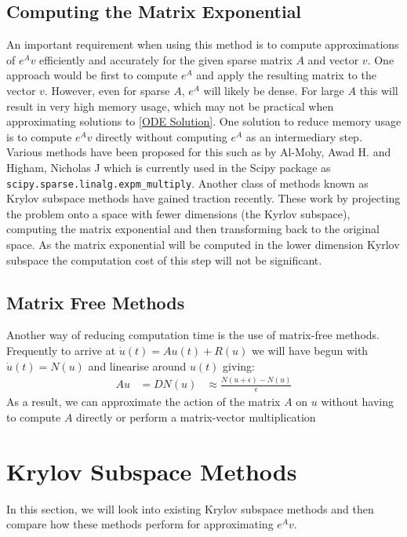 \documentclass{article}
\begin{document}
\subsection{Computing the Matrix Exponential}
An important requirement when using this method is to compute approximations of $e^{A}v$ efficiently and accurately for the given sparse matrix $A$ and vector $v$.
One approach would be first to compute $e^A$ and apply the resulting matrix to the vector $v$.
However, even for sparse $A$, $e^{A}$ will likely be dense. For large $A$ this will result in very high memory usage, which may not be practical when approximating solutions to \eqref{ODE Solution}.
One solution to reduce memory usage is to compute $e^{A}v$ directly without computing $e^{A}$ as an intermediary step.\\
Various methods have been proposed for this such as by Al-Mohy, Awad H. and Higham, Nicholas J\cite{AlMohy2011} which is currently used in the Scipy package as \verb|scipy.sparse.linalg.expm_multiply|.
Another class of methods known as Krylov subspace methods have gained traction recently\cite{Moler2003}.
These work by projecting the problem onto a space with fewer dimensions (the Kyrlov subspace), computing the matrix exponential and then transforming back to the original space.
As the matrix exponential will be computed in the lower dimension Kyrlov subspace the computation cost of this step will not be significant.
\subsection{Matrix Free Methods}
Another way of reducing computation time is the use of matrix-free methods.
Frequently to arrive at $\dot u(t) = Au(t) + R(u)$ we will have begun with $\dot u(t) = N(u)$ and linearise around $u(t)$ giving:
\begin{align*}
Au &= DN(u)
&\approx \frac{N(u+\epsilon)-N(u)}{\epsilon}
\end{align*}
As a result, we can approximate the action of the matrix  $A$ on $u$ without having to compute $A$ directly or perform a matrix-vector multiplication

\section{Krylov Subspace Methods}
In this section, we will look into existing Krylov subspace methods and then compare how these methods perform for approximating $e^{A}v$.
\end{document}

